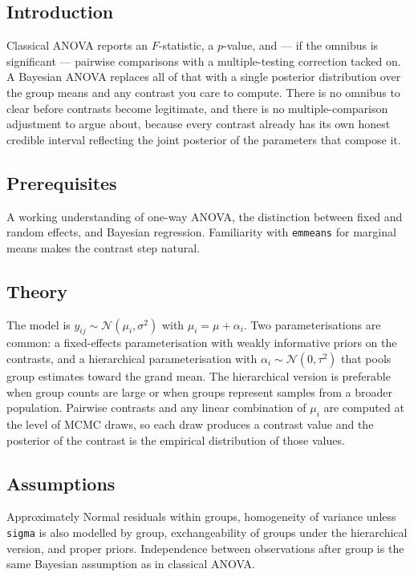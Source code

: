\documentclass[
]{article}
\author{}
\date{\vspace{-2.5em}}
\begin{document}
\subsection{Introduction}\label{introduction}

Classical ANOVA reports an \(F\)-statistic, a \(p\)-value, and --- if
the omnibus is significant --- pairwise comparisons with a
multiple-testing correction tacked on. A Bayesian ANOVA replaces all of
that with a single posterior distribution over the group means and any
contrast you care to compute. There is no omnibus to clear before
contrasts become legitimate, and there is no multiple-comparison
adjustment to argue about, because every contrast already has its own
honest credible interval reflecting the joint posterior of the
parameters that compose it.

\subsection{Prerequisites}\label{prerequisites}

A working understanding of one-way ANOVA, the distinction between fixed
and random effects, and Bayesian regression. Familiarity with
\texttt{emmeans} for marginal means makes the contrast step natural.

\subsection{Theory}\label{theory}

The model is \(y_{ij} \sim \mathcal N(\mu_i, \sigma^2)\) with
\(\mu_i = \mu + \alpha_i\). Two parameterisations are common: a
fixed-effects parameterisation with weakly informative priors on the
contrasts, and a hierarchical parameterisation with
\(\alpha_i \sim \mathcal N(0, \tau^2)\) that pools group estimates
toward the grand mean. The hierarchical version is preferable when group
counts are large or when groups represent samples from a broader
population. Pairwise contrasts and any linear combination of \(\mu_i\)
are computed at the level of MCMC draws, so each draw produces a
contrast value and the posterior of the contrast is the empirical
distribution of those values.

\subsection{Assumptions}\label{assumptions}

Approximately Normal residuals within groups, homogeneity of variance
unless \texttt{sigma} is also modelled by group, exchangeability of
groups under the hierarchical version, and proper priors. Independence
between observations after group is the same Bayesian assumption as in
classical ANOVA.
\end{document}
